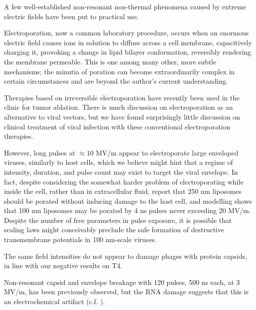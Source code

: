 \documentclass[paper.tex]{subfiles}
\begin{document}
\begin{multicols}{1}


A few well-established non-resonant non-thermal phenomena caused by extreme electric fields have been put to practical use.

Electroporation\cite{Electroporation1988}, now a common laboratory procedure, occurs when an enormous electric field causes ions in solution to diffuse across a cell membrane, capacitively charging it, provoking a change in lipid bilayer conformation\cite{Membrane2016}, reversibly rendering the membrane permeable. This is one among many other, more subtle mechanisms; the minutia of poration can become extraordinarily complex in certain circumstances and are beyond the author's current understanding\cite{Theoretical2007}. 

Therapies based on irreversible electroporation\cite{Nonthermal2013}\cite{Lipid2017} have recently been used in the clinic\cite{Irreversible2013} for tumor ablation. There is much discussion on electroporation as an alternative to viral vectors, but we have found surprisingly little discussion on clinical treatment of viral infection with these conventional electroporation therapies.

However, long pulses at $\approx10$ MV/m appear to electroporate large enveloped viruses, similarly to host cells\cite{AC2017}, which we believe might hint that a regime of intensity, duration, and pulse count may exist to target the viral envelope. In fact, despite considering the somewhat harder problem of electroporating while inside the cell, rather than in extracellular fluid, \cite{Electroporation2013} report that 250 nm liposomes should be porated without inducing damage to the host cell, and modelling shows that 100 nm liposomes may be porated by 4 ns pulses never exceeding 20 MV/m. Despite the number of free parameters in pulse exposure, it is possible that scaling laws might conceivably preclude the safe formation of destructive transmembrane potentials in 100 nm-scale viruses.

The same field intensities do not appear to damage phages with protein capsids\cite{Manipulation2013}, in line with our negative results on T4.

Non-resonant capsid and envelope breakage with 120 pulses, 500 ns each, at 3 MV/m, has been previously observed\cite{Inactivation1990}, but the RNA damage suggests that this is an electrochemical artifact \cite{Formation1996} (c.f. \cite{Microwave1987}). 


\end{multicols}
\end{document}
